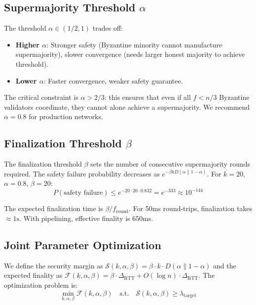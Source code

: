 \documentclass[11pt,a4paper]{article}
\begin{document}
\subsection{Supermajority Threshold $\alpha$}

The threshold $\alpha \in (1/2, 1)$ trades off:
\begin{itemize}
\item \textbf{Higher $\alpha$}: Stronger safety (Byzantine minority cannot manufacture
supermajority), slower convergence (needs larger honest majority to achieve threshold).
\item \textbf{Lower $\alpha$}: Faster convergence, weaker safety guarantee.
\end{itemize}

The critical constraint is $\alpha > 2/3$: this ensures that even if all $f < n/3$
Byzantine validators coordinate, they cannot alone achieve a supermajority. We recommend
$\alpha = 0.8$ for production networks.

\subsection{Finalization Threshold $\beta$}

The finalization threshold $\beta$ sets the number of consecutive supermajority rounds
required. The safety failure probability decreases as $e^{-\beta k D(\alpha \| 1-\alpha)}$.
For $k=20$, $\alpha=0.8$, $\beta=20$:
\begin{equation}
P(\text{safety failure}) \leq e^{-20 \cdot 20 \cdot 0.832} = e^{-333} \approx 10^{-144}
\end{equation}

The expected finalization time is $\beta / f_{\text{round}}$. For 50ms round-trips,
finalization takes $\approx 1\text{s}$. With pipelining, effective finality is 650ms.

\subsection{Joint Parameter Optimization}

We define the security margin as $\mathcal{S}(k, \alpha, \beta) = \beta \cdot k \cdot D(\alpha \| 1-\alpha)$
and the expected finality as $\mathcal{F}(k, \alpha, \beta) = \beta \cdot \Delta_{\text{RTT}} + O(\log n) \cdot \Delta_{\text{RTT}}$.
The optimization problem is:
\begin{equation}
\min_{k, \alpha, \beta} \mathcal{F}(k, \alpha, \beta) \quad \text{s.t.} \quad \mathcal{S}(k, \alpha, \beta) \geq \lambda_{\text{target}}
\end{equation}
\end{document}
